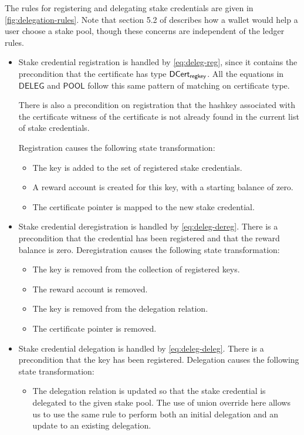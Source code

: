 The rules for registering and delegating stake credentials are given in
\cref{fig:delegation-rules}.  Note that section 5.2 of \cite{delegation_design}
describes how a wallet would help a user choose a stake pool, though these
concerns are independent of the ledger rules.

\begin{itemize}
\item Stake credential registration is handled by \cref{eq:deleg-reg}, since it
  contains the precondition that the certificate has type $\mathsf{DCert_{regkey}}$.  All
  the equations in $\mathsf{DELEG}$ and $\mathsf{POOL}$ follow this same pattern
  of matching on certificate type.

  There is also a precondition on registration that the hashkey associated with
  the certificate witness of the certificate is not already found in the current
  list of stake credentials.

    Registration causes the following state transformation:
    \begin{itemize}
    \item The key is added to the set of registered stake credentials.
      \item A reward account is created for this key, with a starting balance of zero.
      \item The certificate pointer is mapped to the new stake credential.
    \end{itemize}

  \item Stake credential deregistration is handled by \cref{eq:deleg-dereg}.
    There is a precondition that the credential has been registered and that
    the reward balance is zero.  Deregistration causes the following state
    transformation:
    \begin{itemize}
      \item The key is removed from the collection of registered keys.
      \item The reward account is removed.
      \item The key is removed from the delegation relation.
      \item The certificate pointer is removed.
    \end{itemize}

  \item Stake credential delegation is handled by \cref{eq:deleg-deleg}.
    There is a precondition that the key has been registered.
    Delegation causes the following state transformation:
    \begin{itemize}
    \item The delegation relation is updated so that the stake credential is
      delegated to the given stake pool. The use of union override here allows
      us to use the same rule to perform both an initial delegation and an
      update to an existing delegation.
    \end{itemize}


\end{itemize}
